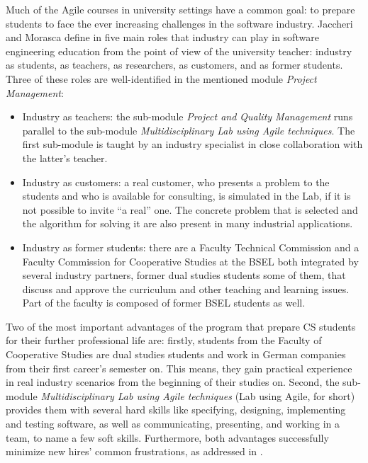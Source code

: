 \documentclass[conference]{IEEEtran}
\begin{document}
Much of the Agile courses in university settings have a common goal: to prepare students to face the ever increasing challenges in the software industry. Jaccheri and Morasca define in \cite{JaMo06} five main roles that industry can play in software engineering education from the point of view of the university teacher: industry as students, as teachers, as researchers, as customers, and as former students. Three of these roles are well-identified in the mentioned module \textit{Project Management}:

\begin{itemize}
  \item Industry as teachers: the sub-module \textit{Project and Quality Management} runs parallel to the sub-module \textit{Multidisciplinary Lab using Agile techniques}. The first sub-module is taught by an industry specialist in close collaboration with the latter's teacher.
  \item Industry as customers: a real customer, who presents a problem to the students and who is available for consulting, is simulated in the Lab, if it is not possible to invite ``a real'' one. The concrete problem that is selected and the algorithm for solving it are also present in many industrial applications.
  \item Industry as former students: there are a Faculty Technical Commission and a Faculty Commission for Cooperative Studies at the BSEL both integrated by several industry partners, former dual studies students some of them, that discuss and approve the curriculum and other teaching and learning issues. Part of the faculty is composed of former BSEL students as well.
\end{itemize}

Two of the most important advantages of the program that prepare CS students for their further professional life are: firstly, students from the Faculty of Cooperative Studies are dual studies students and work in German companies from their first career's semester on. This means, they gain practical experience in real industry scenarios from the beginning of their studies on. Second, the sub-module \textit{Multidisciplinary Lab using Agile techniques} (Lab using Agile, for short) provides them with several hard skills like specifying, designing, implementing and testing software, as well as communicating, presenting, and working in a team, to name a few soft skills. Furthermore, both advantages successfully minimize new hires' common frustrations, as addressed in \cite{Co02}. 
\end{document}
